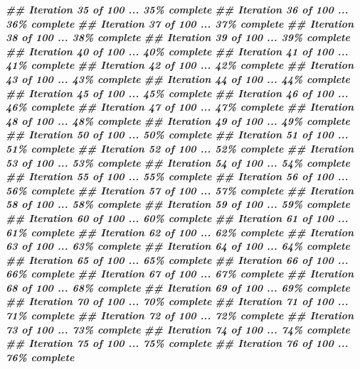 \documentclass[
]{book}
\newenvironment{Shaded}{\begin{snugshade}}{\end{snugshade}}
\newcommand{\DocumentationTok}[1]{\textcolor[rgb]{0.56,0.35,0.01}{\textbf{\textit{#1}}}}
\begin{document}
\begin{Shaded}
\begin{Highlighting}[]
\DocumentationTok{\#\# Iteration 35 of 100 ... 35\% complete}
\DocumentationTok{\#\# Iteration 36 of 100 ... 36\% complete}
\DocumentationTok{\#\# Iteration 37 of 100 ... 37\% complete}
\DocumentationTok{\#\# Iteration 38 of 100 ... 38\% complete}
\DocumentationTok{\#\# Iteration 39 of 100 ... 39\% complete}
\DocumentationTok{\#\# Iteration 40 of 100 ... 40\% complete}
\DocumentationTok{\#\# Iteration 41 of 100 ... 41\% complete}
\DocumentationTok{\#\# Iteration 42 of 100 ... 42\% complete}
\DocumentationTok{\#\# Iteration 43 of 100 ... 43\% complete}
\DocumentationTok{\#\# Iteration 44 of 100 ... 44\% complete}
\DocumentationTok{\#\# Iteration 45 of 100 ... 45\% complete}
\DocumentationTok{\#\# Iteration 46 of 100 ... 46\% complete}
\DocumentationTok{\#\# Iteration 47 of 100 ... 47\% complete}
\DocumentationTok{\#\# Iteration 48 of 100 ... 48\% complete}
\DocumentationTok{\#\# Iteration 49 of 100 ... 49\% complete}
\DocumentationTok{\#\# Iteration 50 of 100 ... 50\% complete}
\DocumentationTok{\#\# Iteration 51 of 100 ... 51\% complete}
\DocumentationTok{\#\# Iteration 52 of 100 ... 52\% complete}
\DocumentationTok{\#\# Iteration 53 of 100 ... 53\% complete}
\DocumentationTok{\#\# Iteration 54 of 100 ... 54\% complete}
\DocumentationTok{\#\# Iteration 55 of 100 ... 55\% complete}
\DocumentationTok{\#\# Iteration 56 of 100 ... 56\% complete}
\DocumentationTok{\#\# Iteration 57 of 100 ... 57\% complete}
\DocumentationTok{\#\# Iteration 58 of 100 ... 58\% complete}
\DocumentationTok{\#\# Iteration 59 of 100 ... 59\% complete}
\DocumentationTok{\#\# Iteration 60 of 100 ... 60\% complete}
\DocumentationTok{\#\# Iteration 61 of 100 ... 61\% complete}
\DocumentationTok{\#\# Iteration 62 of 100 ... 62\% complete}
\DocumentationTok{\#\# Iteration 63 of 100 ... 63\% complete}
\DocumentationTok{\#\# Iteration 64 of 100 ... 64\% complete}
\DocumentationTok{\#\# Iteration 65 of 100 ... 65\% complete}
\DocumentationTok{\#\# Iteration 66 of 100 ... 66\% complete}
\DocumentationTok{\#\# Iteration 67 of 100 ... 67\% complete}
\DocumentationTok{\#\# Iteration 68 of 100 ... 68\% complete}
\DocumentationTok{\#\# Iteration 69 of 100 ... 69\% complete}
\DocumentationTok{\#\# Iteration 70 of 100 ... 70\% complete}
\DocumentationTok{\#\# Iteration 71 of 100 ... 71\% complete}
\DocumentationTok{\#\# Iteration 72 of 100 ... 72\% complete}
\DocumentationTok{\#\# Iteration 73 of 100 ... 73\% complete}
\DocumentationTok{\#\# Iteration 74 of 100 ... 74\% complete}
\DocumentationTok{\#\# Iteration 75 of 100 ... 75\% complete}
\DocumentationTok{\#\# Iteration 76 of 100 ... 76\% complete}

\end{Highlighting}
\end{Shaded}
\end{document}
